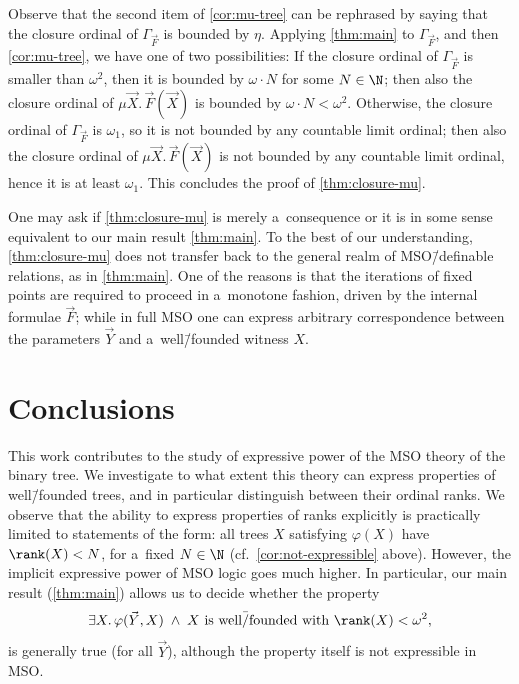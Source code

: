 Observe that the second item of \cref{cor:mu-tree} can be rephrased by saying that the closure ordinal of $\Gamma_{\!\!\vec{F}}$ is bounded by $\eta$.
Applying \cref{thm:main} to $\Gamma_{\!\!\vec{F}}$, and then \cref{cor:mu-tree}, we have one of two possibilities:
If the closure ordinal of $\Gamma_{\!\!\vec{F}}$ is smaller than $\omega^2$, then it is bounded by $\omega\cdot N$ for some $N\in\N$;
then also the closure ordinal of $\mu\vec{X}.\,\vec{F}(\vec{X})$ is bounded by $\omega\cdot N<\omega^2$.
Otherwise, the closure ordinal of $\Gamma_{\!\!\vec{F}}$ is $\omega_1$, so it is not bounded by any countable limit ordinal;
then also the closure ordinal of $\mu\vec{X}.\,\vec{F}(\vec{X})$ is not bounded by any countable limit ordinal, hence it is at least $\omega_1$.
This concludes the proof of \cref{thm:closure-mu}.

\begin{rem}
	One may ask if \cref{thm:closure-mu} is merely a~consequence or it is in some sense equivalent to our main result \cref{thm:main}.
	To the best of our understanding, \cref{thm:closure-mu} does not transfer back to the general realm of MSO\=/definable relations, as in \cref{thm:main}.
	One of the reasons is that the iterations of fixed points are required to proceed in a~monotone fashion, driven by the internal formulae $\vec{F}$;
	while in full MSO one can express arbitrary correspondence between the parameters $\vec{Y}$ and a~well\=/founded witness $X$.
\end{rem}



\section{Conclusions}
\label{sec:conclusions}

This work contributes to the study of expressive power of the MSO theory of the binary tree.
We investigate to what extent this theory can express properties of well\=/founded trees, and in particular distinguish between their ordinal ranks.
We observe that the ability to express properties of ranks explicitly is practically limited to statements of the form:
all trees $X$ satisfying $\varphi (X)$ have $\rank (X) < N$, for a~fixed $N \in \N$ (cf.\ \cref{cor:not-expressible} above).
However, the implicit expressive power of MSO logic goes much higher.
In particular, our main result (\cref{thm:main}) allows us to decide whether the property
\[
  \exists X. \, \varphi (\vec{Y}, X) \; \wedge \;
  X \mbox{ is well\=/founded with } \rank (X) < \omega^2,
\]
is generally true (for all $\vec{Y}$), although the property itself is not expressible in MSO.

